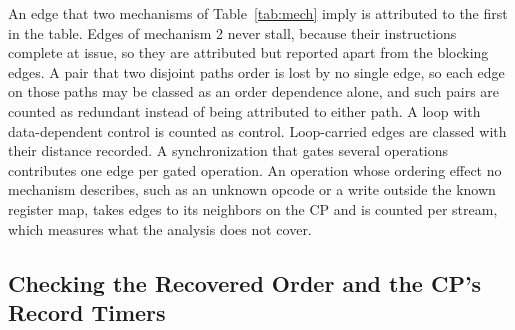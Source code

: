An edge that two mechanisms of Table~\ref{tab:mech} imply is attributed to the first in the table.
Edges of mechanism 2 never stall, because their instructions complete at issue, so they are attributed but reported apart from the blocking edges.
A pair that two disjoint paths order is lost by no single edge, so each edge on those paths may be classed as an order dependence alone, and such pairs are counted as redundant instead of being attributed to either path.
A loop with data-dependent control is counted as control.
Loop-carried edges are classed with their distance recorded.
A synchronization that gates several operations contributes one edge per gated operation.
An operation whose ordering effect no mechanism describes, such as an unknown opcode or a write outside the known register map, takes edges to its neighbors on the CP and is counted per stream, which measures what the analysis does not cover.

\subsection{Checking the Recovered Order and the CP's Record Timers}
\label{app:timer}

